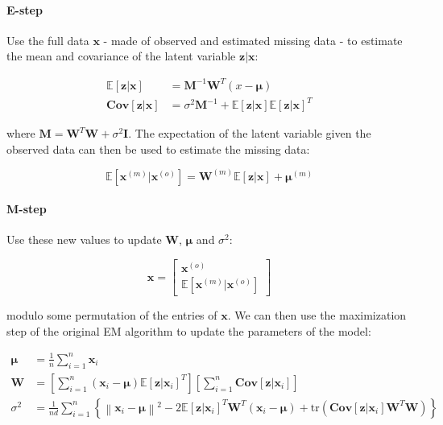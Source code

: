 \documentclass{article}
\newcommand{\E}{\mathbb{E}}
\begin{document}
\paragraph{E-step} Use the full data $\mathbf{x}$ - made of observed and estimated missing data - to estimate the mean and covariance of the latent variable $\mathbf{z}|\mathbf{x}$:

\begin{align}
    \label{eq:ppca_e_step_E}
    \E[\mathbf{z}|\mathbf{x}] &= \mathbf{M}^{-1}\mathbf{W}^{T}\left(x - \boldsymbol{\mu}\right) \\
    \label{eq:ppca_e_step_Cov}
    \mathbf{Cov}[\mathbf{z}|\mathbf{x}] &= \sigma^2\mathbf{M}^{-1} + \E[\mathbf{z}|\mathbf{x}]\E[\mathbf{z}|\mathbf{x}]^T
\end{align}
    
    where $\mathbf{M} = \mathbf{W}^{T}\mathbf{W} + \sigma^2\mathbf{I}$. The expectation of the latent variable given the observed data can then be used to estimate the missing data:

\begin{equation}
    \label{eq:ppca_e_step_completion}
    \E[\mathbf{x}^{(m)}|\mathbf{x}^{(o)}] = \mathbf{W}^{(m)}\E[\mathbf{z}|\mathbf{x}] + \boldsymbol{\mu}^{(m)}
\end{equation}

\paragraph{M-step} Use these new values to update $\mathbf{W}$, $\boldsymbol{\mu}$ and $\sigma^2$:

\begin{equation}
    \label{eq:ppca_m_step}
    \mathbf{x} = \left[
        \begin{array}{c}
            \mathbf{x}^{(o)} \\
            \E[\mathbf{x}^{(m)}|\mathbf{x}^{(o)}]
        \end{array}       
    \right]
\end{equation}

modulo some permutation of the entries of $\mathbf{x}$. We can then use the maximization step of the original EM algorithm to update the parameters of the model:

\begin{align}
    \label{eq:ppca_mu}
    \boldsymbol{\mu} &= \frac{1}{n}\sum_{i=1}^n \mathbf{x}_i \\
    \label{eq:ppca_W}
    \mathbf{W} &= \left[
        \sum_{i=1}^n \left(\mathbf{x}_i - \boldsymbol{\mu}\right) \E[\mathbf{z}|\mathbf{x}_i]^T
    \right] \left[
        \sum_{i=1}^n \mathbf{Cov}[\mathbf{z}|\mathbf{x}_i]
    \right] \\
    \label{eq:ppca_sigma}
    \sigma^2 &= \frac{1}{nd}\sum_{i=1}^n \left\{
        \left\| \mathbf{x}_i - \boldsymbol{\mu}\right\|^2 - 2\E[\mathbf{z}|\mathbf{x}_i]^T\mathbf{W}^T\left(\mathbf{x}_i - \boldsymbol{\mu}\right) + \text{tr}\left(\mathbf{Cov}[\mathbf{z}|\mathbf{x}_i]\mathbf{W}^T\mathbf{W}\right)
    \right\}
\end{align}
\end{document}
